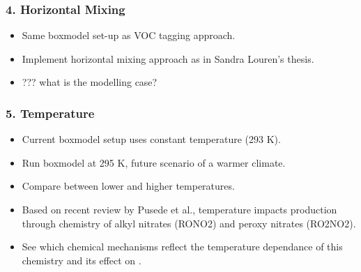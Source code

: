 {
    \begin{frame}[plain]
    \end{frame}
}

\begin{frame}
    \frametitle{4. Horizontal Mixing}

    \begin{itemize}
        \item Same boxmodel set-up as VOC tagging approach.
        \item Implement horizontal mixing approach as in Sandra Louren's thesis.
        \item ??? what is the modelling case?
    \end{itemize}
\end{frame}

\begin{frame}
    \frametitle{5. Temperature}

    \begin{itemize}
        \item Current boxmodel setup uses constant temperature (293 K).
        \item Run boxmodel at 295 K, future scenario of a warmer climate.
        \item Compare  between lower and higher temperatures.
        \item Based on recent review by Pusede et al., temperature impacts  production through chemistry of alkyl nitrates (RONO2) and peroxy nitrates (RO2NO2).
        \item See which chemical mechanisms reflect the temperature dependance of this chemistry and its effect on .
    \end{itemize}
\end{frame}

